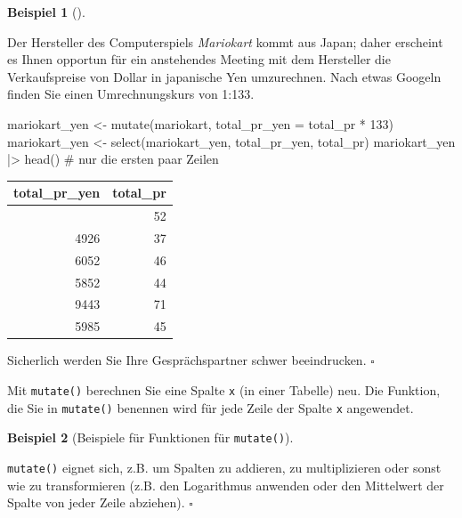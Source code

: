 \documentclass[
  letterpaper,
]{scrbook}
\newenvironment{Shaded}{\begin{snugshade}}{\end{snugshade}}
\newcommand{\AttributeTok}[1]{\textcolor[rgb]{0.40,0.45,0.13}{#1}}
\newcommand{\CommentTok}[1]{\textcolor[rgb]{0.37,0.37,0.37}{#1}}
\newcommand{\DecValTok}[1]{\textcolor[rgb]{0.68,0.00,0.00}{#1}}
\newcommand{\FunctionTok}[1]{\textcolor[rgb]{0.28,0.35,0.67}{#1}}
\newcommand{\NormalTok}[1]{\textcolor[rgb]{0.00,0.23,0.31}{#1}}
\newcommand{\OtherTok}[1]{\textcolor[rgb]{0.00,0.23,0.31}{#1}}
\newcommand{\SpecialCharTok}[1]{\textcolor[rgb]{0.37,0.37,0.37}{#1}}
\theoremstyle{definition}
\theoremstyle{definition}
\newtheorem{example}{Beispiel}[chapter]
\theoremstyle{definition}
\theoremstyle{remark}
\begin{document}
\begin{example}[]\protect\hypertarget{exm-mutate}{}\label{exm-mutate}

Der Hersteller des Computerspiels \emph{Mariokart} kommt aus Japan;
daher erscheint es Ihnen opportun für ein anstehendes Meeting mit dem
Hersteller die Verkaufspreise von Dollar in japanische Yen umzurechnen.
Nach etwas Googeln finden Sie einen Umrechnungskurs von 1:133.

\begin{Shaded}
\begin{Highlighting}[]
\NormalTok{mariokart\_yen }\OtherTok{\textless{}{-}} 
  \FunctionTok{mutate}\NormalTok{(mariokart, }\AttributeTok{total\_pr\_yen =}\NormalTok{ total\_pr }\SpecialCharTok{*} \DecValTok{133}\NormalTok{)}
\NormalTok{mariokart\_yen }\OtherTok{\textless{}{-}} \FunctionTok{select}\NormalTok{(mariokart\_yen, total\_pr\_yen, total\_pr)}
\NormalTok{mariokart\_yen }\SpecialCharTok{|\textgreater{}} \FunctionTok{head}\NormalTok{()  }\CommentTok{\# nur die ersten paar Zeilen}
\end{Highlighting}
\end{Shaded}

\begin{longtable}[]{@{}rr@{}}
\toprule\noalign{}
total\_pr\_yen & total\_pr \\
\midrule\noalign{}
\endhead
\bottomrule\noalign{}
\endlastfoot
6856 & 52 \\
4926 & 37 \\
6052 & 46 \\
5852 & 44 \\
9443 & 71 \\
5985 & 45 \\
\end{longtable}

Sicherlich werden Sie Ihre Gesprächspartner schwer beeindrucken.
\(\square\)

\end{example}

Mit \texttt{mutate()} berechnen Sie eine Spalte \texttt{x} (in einer
Tabelle) neu. Die Funktion, die Sie in \texttt{mutate()} benennen wird
für jede Zeile der Spalte \texttt{x} angewendet.

\begin{example}[Beispiele für Funktionen für
\texttt{mutate()}]\protect\hypertarget{exm-mutate2}{}\label{exm-mutate2}

\texttt{mutate()} eignet sich, z.B. um Spalten zu addieren, zu
multiplizieren oder sonst wie zu transformieren (z.B. den Logarithmus
anwenden oder den Mittelwert der Spalte von jeder Zeile abziehen).
\(\square\)

\end{example}
\end{document}
